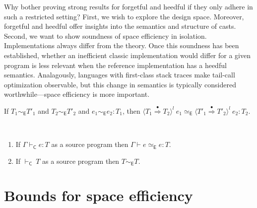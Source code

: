 \documentclass[9pt]{extarticle}
\newcommand{\ottnt}[1]{\mathit{#1}}
\begin{document}
{\iffull
Why bother proving strong results for
forgetful and heedful if they only adhere in such a restricted
setting?
First, we wish to explore the design space. Moreover, forgetful and heedful
offer insights into the semantics and structure of casts.
Second, we want to show soundness of space efficiency in
isolation. Implementations always differ from the theory. {\iffull
  Once this soundness has been established, whether an inefficient
  classic implementation would differ for a given program is less
  relevant when the reference implementation has a heedful
  semantics. \fi}
Analagously, languages with first-class stack traces make tail-call
optimization observable, but this change in semantics is typically
considered worthwhile---space efficiency is more important.

\else

\begin{lemma}
  If $ \ottnt{T_{{\mathrm{1}}}}   \sim _{  \mathsf{E}  }  \ottnt{T'_{{\mathrm{1}}}} $ and $ \ottnt{T_{{\mathrm{2}}}}   \sim _{  \mathsf{E}  }  \ottnt{T'_{{\mathrm{2}}}} $ and $ \ottnt{e_{{\mathrm{1}}}}   \sim _{  \mathsf{E}  }  \ottnt{e_{{\mathrm{2}}}}  :  \ottnt{T_{{\mathrm{1}}}} $, then
  $  \langle  \ottnt{T_{{\mathrm{1}}}}  \mathord{ \overset{\bullet}{\Rightarrow} }  \ottnt{T_{{\mathrm{2}}}}  \rangle^{ \ottnt{l} } ~  \ottnt{e_{{\mathrm{1}}}}    \simeq _{  \mathsf{E}  }   \langle  \ottnt{T'_{{\mathrm{1}}}}  \mathord{ \overset{\bullet}{\Rightarrow} }  \ottnt{T'_{{\mathrm{2}}}}  \rangle^{ \ottnt{l} } ~  \ottnt{e_{{\mathrm{2}}}}   :  \ottnt{T_{{\mathrm{2}}}} $.
\end{lemma}

\begin{lemma}
  ~

  \noindent
  \begin{enumerate}
  \item If $ \Gamma   \vdash _{  \mathsf{C}  }  \ottnt{e}  :  \ottnt{T} $ as a source program then $ \Gamma   \vdash   \ottnt{e}   \simeq _{  \mathsf{E}  }  \ottnt{e}  :  \ottnt{T} $.
  \item If $ \mathord{  \vdash _{  \mathsf{C}  } }~ \ottnt{T} $ as a source program then $ \ottnt{T}   \sim _{  \mathsf{E}  }  \ottnt{T} $.
  \end{enumerate}
\end{lemma}

\fi}


\section{Bounds for space efficiency}
\label{sec:bounds}
\end{document}
